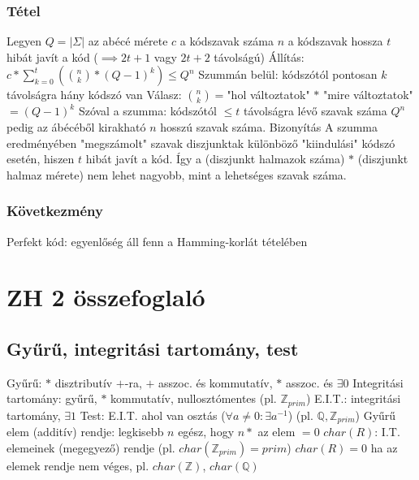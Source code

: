 \documentclass[12pt,a4paper]{article}
\begin{document}
\subsubsection{Tétel}

\begin{outline}
	\1 Legyen
		\2 $Q=|\Sigma|$ az abécé mérete
		\2 $c$ a kódszavak száma
		\2 $n$ a kódszavak hossza
		\2 $t$ hibát javít a kód ($\implies 2t+1$ vagy $2t+2$ távolságú)
	\1 Állítás: $c * \sum_{k=0}^{t}(\binom{n}{k} * (Q-1)^k) \le Q^n$
		\2 Szummán belül: kódszótól pontosan $k$ távolságra hány kódszó van
		\2 Válasz: $\binom{n}{k}=$"hol változtatok" $*$ "mire változtatok"$=(Q-1)^k$
		\2 Szóval a szumma: kódszótól $\le t$ távolságra lévő szavak száma
		\2 $Q^n$ pedig az ábécéből kirakható $n$ hosszú szavak száma.
	\1 Bizonyítás
		\2 A szumma eredményében "megszámolt" szavak diszjunktak különböző "kiindulási" kódszó esetén, hiszen $t$ hibát javít a kód.
		\2 Így a (diszjunkt halmazok száma) $*$ (diszjunkt halmaz mérete) nem lehet nagyobb, mint a lehetséges szavak száma.
\end{outline}

\subsubsection{Következmény}

\begin{outline}
	\1 Perfekt kód: egyenlőség áll fenn a Hamming-korlát tételében
\end{outline}

\pagebreak

\section{ZH 2 összefoglaló}

\subsection{Gyűrű, integritási tartomány, test}

\begin{outline}
	\1 Gyűrű: $*$ disztributív $+$-ra, $+$ asszoc. és kommutatív, $*$ asszoc. és $\exists 0$
	\1 Integritási tartomány: gyűrű, $*$ kommutatív, nullosztómentes (pl. $\mathbb{Z}_{prim}$)
	\1 E.I.T.: integritási tartomány, $\exists 1$
	\1 Test: E.I.T. ahol van osztás ($\forall a \ne 0: \exists a^{-1}$) (pl. $\mathbb{Q}, \mathbb{Z}_{prim}$)
	\1 Gyűrű elem (additív) rendje: legkisebb $n$ egész, hogy $n*$ az elem  $=0$
	\1 $char(R)$: I.T. elemeinek (megegyező) rendje (pl. $char(\mathbb{Z}_{prim})=prim$)
		\2 $char(R)=0$ ha az elemek rendje nem véges, pl. $char(\mathbb{Z})$, $char(\mathbb{Q})$
\end{outline}
\end{document}
